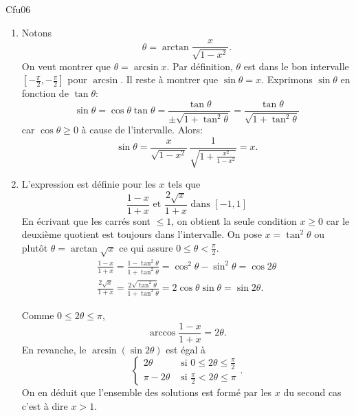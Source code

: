 \begin{tiny}Cfu06\end{tiny} 
\begin{enumerate}
  \item Notons
\[
  \theta = \arctan \frac{x}{\sqrt{1-x^2}}.
\]
On veut montrer que $\theta = \arcsin x$.\newline
Par définition, $\theta$ est dans le bon intervalle $\left[ -\frac{\pi}{2}, -\frac{\pi}{2}\right]$ pour $\arcsin$. Il reste à montrer que $\sin \theta = x$.\newline
Exprimons $\sin \theta$ en fonction de $\tan \theta$:
\[
  \sin \theta = \cos \theta \tan \theta 
  = \frac{\tan \theta}{\pm \sqrt{1+ \tan^2 \theta}}
  = \frac{\tan \theta}{\sqrt{1+ \tan^2 \theta}}
\]
car $\cos \theta \geq 0$ à cause de l'intervalle. Alors:
\[
  \sin \theta = \frac{x}{\sqrt{1-x^2}}\, \frac{1}{\sqrt{1 + \frac{x^2}{1 - x^2}}}
  = x.
\]
  \item L'expression est définie pour les $x$ tels que
\[
  \frac{1-x}{1+x} \text{ et } \frac{2\sqrt{x}}{1+x} \text{ dans } \left[ -1, 1 \right]
\]
En écrivant que les carrés sont $\leq 1$, on obtient la seule condition $x\geq 0$ car le deuxième quotient est toujours dans l'intervalle.
On pose $x = \tan^2 \theta$ ou plutôt $\theta = \arctan \sqrt{x}$ ce qui assure $0\leq \theta < \frac{\pi}{2}$.
\begin{multline*}
  \frac{1-x}{1+x} = \frac{1-\tan^2 \theta}{1+\tan^2 \theta}
  = \cos ^2 \theta - \sin^2 \theta = \cos 2\theta\\
  \frac{2\sqrt{x}}{1+x} = \frac{2\sqrt{\tan^2 \theta}}{1+\tan^2 \theta}
  = 2\cos \theta \sin \theta = \sin 2\theta.
\end{multline*}

Comme $0 \leq 2\theta \leq \pi$,
\[
  \arccos \frac{1-x}{1+x} = 2\theta.
\]
En revanche, le $\arcsin(\sin 2\theta)$ est égal à
\[
  \left\lbrace
  \begin{aligned}
    2\theta &\text{ si } 0 \leq 2 \theta \leq \frac{\pi}{2} \\
    \pi - 2\theta &\text{ si } \frac{\pi}{2} < 2 \theta \leq \pi
  \end{aligned}
\right. .
\]
On en déduit que l'ensemble des solutions est formé par les $x$ du second cas c'est à dire $x > 1$.
\end{enumerate}

